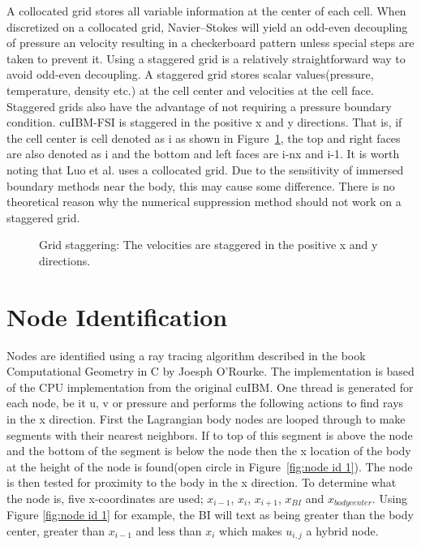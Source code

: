 \documentclass[onehalf,11pt]{beavtex}
\begin{document}
A collocated grid stores all variable information at the center of each cell.
When discretized on a collocated grid, Navier--Stokes will yield an odd-even decoupling of pressure an velocity resulting in a checkerboard pattern unless special steps are taken to prevent it. 
Using a staggered grid is a relatively straightforward way to avoid odd-even decoupling.
A staggered grid stores scalar values(pressure, temperature, density etc.) at the cell center and velocities at the cell face. 
Staggered grids also have the advantage of not requiring a pressure boundary condition.
cuIBM-FSI is staggered in the positive x and y directions. 
That is, if the cell center is cell denoted as i as shown in Figure~\ref{fig:stagger}, the top and right faces are also denoted as i and the bottom and left faces are i-nx and i-1. 
It is worth noting that Luo et al.\cite{Luo:2012gx} uses a collocated grid.
Due to the sensitivity of immersed boundary methods near the body, this may cause some difference.
There is no theoretical reason why the numerical suppression method should not work on a staggered grid.
\begin{figure}[!htb]
	\centering
	
	\caption{Grid staggering: The velocities are staggered in the positive x and y directions.}
	\label{fig:stagger}
\end{figure}

\section{Node Identification}
Nodes are identified using a ray tracing algorithm described in the book Computational Geometry in C by Joesph O'Rourke\cite{o1998computational}.
The implementation is based of the CPU implementation from the original cuIBM. 
One thread is generated for each node, be it u, v or pressure and performs the following actions to find rays in the x direction.
First the Lagrangian body nodes are looped through to make segments with their nearest neighbors.
If to top of this segment is above the node and the bottom of the segment is below the node then the x location of the body at the height of the node is found(open circle in Figure~\ref{fig:node id 1}).
The node is then tested for proximity to the body in the x direction. 
To determine what the node is, five x-coordinates are used; $x_{i-1}$, $x_{i}$, $x_{i+1}$, $x_{BI}$ and $x_{body center}$. 
Using Figure \ref{fig:node id 1} for example, the BI will text as being greater than the body center, greater than $x_{i-1}$ and less than $x_{i}$ which makes $u_{i,j}$ a hybrid node. 
\end{document}
